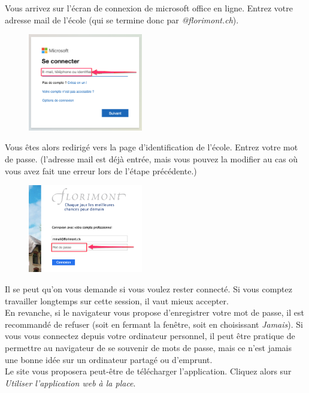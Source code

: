 Vous arrivez sur l'écran de connexion de microsoft office en ligne. Entrez votre adresse mail de l'école (qui se termine donc par \textit{@florimont.ch}).

\begin{figure}[H]
\includegraphics[width=5cm]{./images/teams/ecran_connexion_office_com_crop}
\centering
\end{figure}

Vous êtes alors redirigé vers la page d'identification de l’école. Entrez votre mot de passe. (l'adresse mail est déjà entrée, mais vous pouvez la modifier au cas où vous avez fait une erreur lors de l'étape précédente.)

\begin{figure}[H]
\includegraphics[width=5cm]{./images/teams/ecran_connexion_florimont_crop}
\centering
\end{figure}

Il se peut qu'on vous demande si vous voulez rester connecté. Si vous comptez travailler longtemps sur cette session, il vaut mieux accepter.\\

En revanche, si le navigateur vous propose d'enregistrer votre mot de passe, il est recommandé de refuser (soit en fermant la fenêtre, soit en choisissant \textit{Jamais}). Si vous vous connectez depuis votre ordinateur personnel, il peut être pratique de permettre au navigateur de se souvenir de mots de passe, mais ce n'est jamais une bonne idée sur un ordinateur partagé ou d'emprunt.\\

Le site vous proposera peut-être de télécharger l’application. Cliquez alors sur \textit{Utiliser l’application web à la place}.\\

